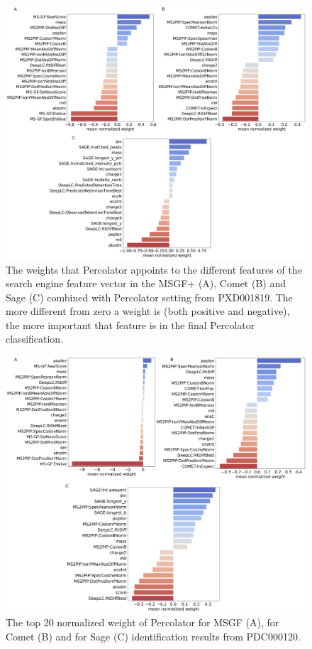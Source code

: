 \documentclass[12pt]{article}
\begin{document}
\begin{figure}[h!]
	\centering
	\includegraphics[width=1\textwidth]{figures//LFQ_weights.png}
	\caption{The weights that Percolator appoints to the different features of the search engine feature vector in the MSGF+ (A), Comet (B) and Sage (C) combined with Percolator setting from PXD001819. The more different from zero a weight is (both positive and negative), the more important that feature is in the final Percolator classification.}
	\label{fig:PXD001819_svm_weights}
\end{figure}

\begin{figure}[h!]
	\centering
	\includegraphics[width=1\textwidth]{figures//CPTAC_weights.png}
	\caption{The top 20 normalized weight of Percolator for MSGF (A), for Comet (B) and for Sage (C) identification results from PDC000120.}
	\label{fig:PDC_ms2rescore_weights}
\end{figure}
\end{document}
